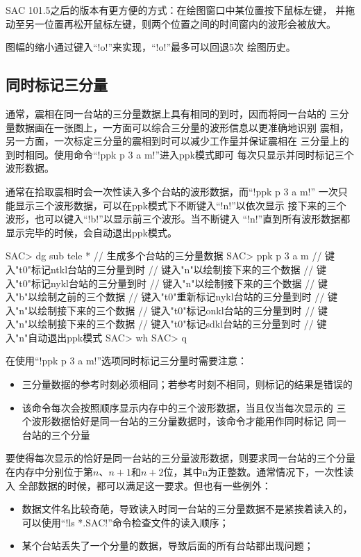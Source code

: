 SAC 101.5之后的版本有更方便的方式：在绘图窗口中某位置按下鼠标左键，
并拖动至另一位置再松开鼠标左键，则两个位置之间的时间窗内的波形会被放大。

图幅的缩小通过键入``!o!''来实现，``!o!''最多可以回退5次
绘图历史。

\subsection{同时标记三分量}
通常，震相在同一台站的三分量数据上具有相同的到时，因而将同一台站的
三分量数据画在一张图上，一方面可以综合三分量的波形信息以更准确地识别
震相，另一方面，一次标定三分量的震相到时可以减少工作量并保证震相在
三分量上的到时相同。使用命令``!ppk p 3 a m!''进入ppk模式即可
每次只显示并同时标记三个波形数据。

通常在拾取震相时会一次性读入多个台站的波形数据，而``!ppk p 3 a m!''
一次只能显示三个波形数据，可以在ppk模式下不断键入``!n!''以依次显示
接下来的三个波形，也可以键入``!b!''以显示前三个波形。当不断键入
``!n!''直到所有波形数据都显示完毕的时候，会自动退出ppk模式。

\begin{SACCode}
SAC> dg sub tele *       // 生成多个台站的三分量数据
SAC> ppk p 3 a m
// 键入"t0"标记ntkl台站的三分量到时
// 键入"n"以绘制接下来的三个数据
// 键入"t0"标记nykl台站的三分量到时
// 键入"n"以绘制接下来的三个数据
// 键入"b"以绘制之前的三个数据
// 键入"t0"重新标记nykl台站的三分量到时
// 键入"n"以绘制接下来的三个数据
// 键入"t0"标记onkl台站的三分量到时
// 键入"n"以绘制接下来的三个数据
// 键入"t0"标记sdkl台站的三分量到时
// 键入"n"自动退出ppk模式
SAC> wh
SAC> q
\end{SACCode}

在使用``!ppk p 3 a m!''选项同时标记三分量时需要注意：
\begin{itemize}
\item 三分量数据的参考时刻必须相同；若参考时刻不相同，则标记的结果是错误的
\item 该命令每次会按照顺序显示内存中的三个波形数据，当且仅当每次显示的
    三个波形数据恰好是同一台站的三分量数据时，该命令才能用作同时标记
    同一台站的三个分量
\end{itemize}

要使得每次显示的恰好是同一台站的三分量波形数据，则要求同一台站的三个分量
在内存中分别位于第$n$、$n+1$和$n+2$位，其中n为正整数。通常情况下，一次性读入
全部数据的时候，都可以满足这一要求。但也有一些例外：
\begin{itemize}
\item 数据文件名比较奇葩，导致读入时同一台站的三分量数据不是紧挨着读入的，
    可以使用``!ls *.SAC!''命令检查文件的读入顺序；
\item 某个台站丢失了一个分量的数据，导致后面的所有台站都出现问题；
\end{itemize}

